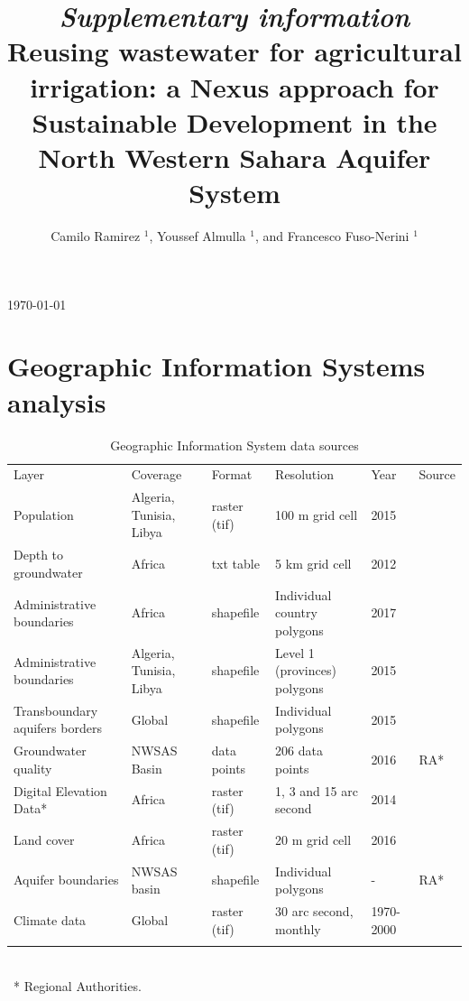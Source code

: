 \documentclass[12pt]{iopart}
\begin{document}
\title[\textit{SI} - Reusing wastewater in agriculture: a Nexus assessment in the NWSAS]{\textit{Supplementary information}\\[12pt] \large Reusing wastewater for agricultural irrigation: a Nexus approach for Sustainable Development in the North Western Sahara Aquifer System}


\author{Camilo Ramirez $^{1}$, Youssef Almulla $^{1}$, and Francesco Fuso-Nerini $^{1}$}

\address{$^{1}$ KTH Royal Institute of Technology, Stockholm, Sweden}
\vspace{10pt}
\begin{indented}
\item[]\today
\end{indented}

\section{Geographic Information Systems analysis}
\begin{table}[!b]
	\caption{\label{tbl:datasources}Geographic Information System data sources}
	{\footnotesize
		\begin{tabular*}{\textwidth}{@{}P{1.4in} P{1in} l P{1.2in} l l@{}}
			\br
			Layer & Coverage & Format & Resolution & Year & Source\\
			\mr
			Population & Algeria, Tunisia, Libya & raster (tif) & 100 m grid cell & 2015 & \cite{Worldpop2012}\\\ms
			Depth to groundwater & Africa & txt table & 5 km grid cell & 2012 & \cite{Quantitativemapsgroundwater2012a}\\\ms
			Administrative boundaries & Africa & shapefile & Individual country polygons & 2017 & \cite{Humanitarian2017}\\\ms
			Administrative boundaries & Algeria, Tunisia, Libya & shapefile & Level 1 (provinces) polygons & 2015 & \cite{GADM}\\\ms
			Transboundary aquifers borders & Global & shapefile & Individual polygons & 2015 & \cite{IGRAC}\\\ms
			Groundwater quality & NWSAS Basin & data points & 206 data points & 2016 & RA*\\\ms
			Digital Elevation Data* & Africa & raster (tif) & 1, 3 and 15 arc second & 2014 & \cite{DEM2014}\\\ms
			Land cover & Africa & raster (tif) & 20 m grid cell & 2016 & \cite{ESA2017}\\\ms
			Aquifer boundaries & NWSAS basin & shapefile & Individual polygons & - & RA*\\\ms
			Climate data & Global & raster (tif) & 30 arc second, monthly & 1970-2000 & \cite{WorldClimGlobalClimate}\\
			\br
		\end{tabular*}\\
		~* Regional Authorities.
	}
\end{table}
\end{document}
